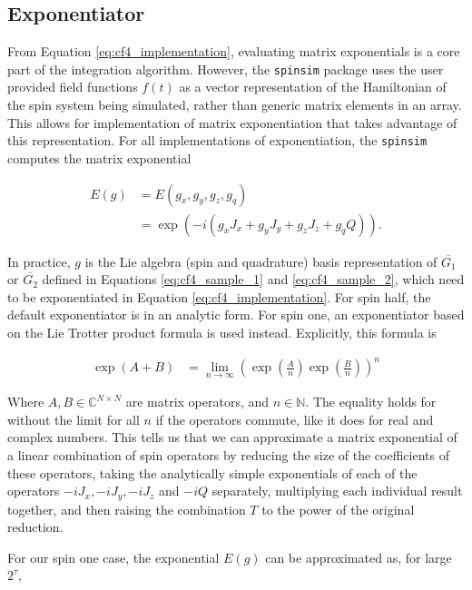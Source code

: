 \documentclass{jors}
\begin{document}
	\subsection{Exponentiator}
		From Equation \eqref{eq:cf4_implementation}, evaluating matrix exponentials is a core part of the integration algorithm. However, the \texttt{spinsim} package uses the user provided field functions \(f(t)\) as a vector representation of the Hamiltonian of the spin system being simulated, rather than generic matrix elements in an array. This allows for implementation of matrix exponentiation that takes advantage of this representation. For all implementations of exponentiation, the \texttt{spinsim} computes the matrix exponential
		
		\begin{align}
			E(g) &= E(g_x, g_y, g_z, g_q)\\
			&= \exp(-i (g_x J_x + g_y J_y + g_z J_z + g_q Q)).
		\end{align}
		
		In practice, \(g\) is the Lie algebra (spin and quadrature) basis representation of \(\overline{G_1}\) or \(\overline{G_2}\) defined in Equations \eqref{eq:cf4_sample_1} and \eqref{eq:cf4_sample_2}, which need to be exponentiated in Equation \eqref{eq:cf4_implementation}. For spin half, the default exponentiator is in an analytic form. For spin one, an exponentiator based on the Lie Trotter product formula \cite{moler_nineteen_2003} is used instead. Explicitly, this formula is
		
		\begin{align}
			\exp\left( A + B\right) &= \lim_{n\to\infty} \left(\exp\left(\frac{A}{n}\right) \exp\left(\frac{B}{n}\right)\right)^n
		\end{align}
		
		Where \(A,B\in\mathbb{C}^{N\times N}\) are matrix operators, and \(n\in\mathbb{N}\). The equality holds for without the limit for all \(n\) if the operators commute, like it does for real and complex numbers. This tells us that we can approximate a matrix exponential of a linear combination of spin operators by reducing the size of the coefficients of these operators, taking the analytically simple exponentials of each of the operators \(-iJ_x, -iJ_y, -iJ_z\) and \(-iQ\) separately, multiplying each individual result together, and then raising the combination \(T\) to the power of the original reduction.
		
		For our spin one case, the exponential \(E(g)\) can be approximated as, for large \(2^\tau\),
\end{document}
